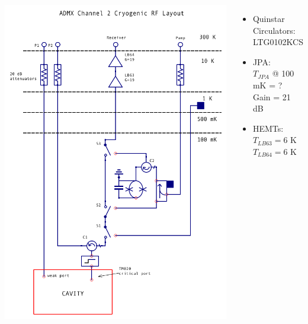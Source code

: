 \documentclass{beamer}
\begin{document}
\begin{frame}
\begin{columns}
\includegraphics[width=\textwidth]{export_cryo_layout_jpa_text}
\begin{itemize}
\item {\tiny Quinstar Circulators: \\ LTG0102KCS}
\item {\tiny JPA: \\ $T_{JPA}$ @ 100 mK = ? \\ Gain = 21 dB}
\item {\tiny HEMTs: \\ $T_{LB63} = 6$ K \\ $T_{LB64} = 6$ K}
\end{itemize}
\end{columns}
\end{frame}
\end{document}
